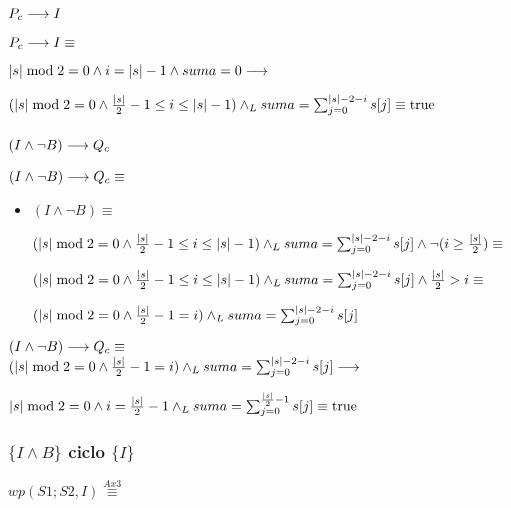\documentclass{article}
\begin{document}
\subsubsection*{$P_{c} \longrightarrow I$}

$P_{c} \longrightarrow I \equiv$

$ |s| \bmod 2 = 0 \wedge i = |s| - 1 \wedge suma = 0 \longrightarrow$

$ (|s| \bmod 2 = 0 \wedge \frac{|s|}{2} - 1 \leq i \leq |s| - 1) \land _L suma = \sum_{j=0}^{|s|-2-i} s[j] \equiv \mathrm{true}$

\subsubsection*{$(I \wedge \neg B) \longrightarrow Q_{c}$}

$ (I \wedge \neg B) \longrightarrow Q_{c} \equiv $

\begin{itemize}
    \item $(I \wedge \neg B) \equiv $

    $ (|s| \bmod 2 = 0 \wedge \frac{|s|}{2} - 1 \leq i \leq |s| - 1) \land _L suma = \sum_{j=0}^{|s|-2-i} s[j] \wedge \neg (i \geq \frac{|s|}{2}) \equiv$

    $ (|s| \bmod 2 = 0 \wedge \frac{|s|}{2} - 1 \leq i \leq |s| - 1) \land _L suma = \sum_{j=0}^{|s|-2-i} s[j] \wedge \frac{|s|}{2} > i \equiv$

    $ (|s| \bmod 2 = 0 \wedge \frac{|s|}{2} - 1 = i ) \land _L suma = \sum_{j=0}^{|s|-2-i} s[j] $
\end{itemize}

$ (I \wedge \neg B) \longrightarrow Q_{c} \equiv $ \\

$ (|s| \bmod 2 = 0 \wedge \frac{|s|}{2} - 1 = i ) \land _L suma = \sum_{j=0}^{|s|-2-i} s[j] \longrightarrow$

$ |s| \bmod 2 = 0 \wedge i = \frac{|s|}{2} - 1 \land _L suma = \sum_{j=0}^{\frac{|s|}{2}-1} s[j] \equiv \mathrm{true} $

\subsubsection*{$\{I \wedge B\}$ ciclo $\{ I \}$}

$wp(S1;S2, I) \stackrel{Ax3}{\equiv}$
\end{document}
